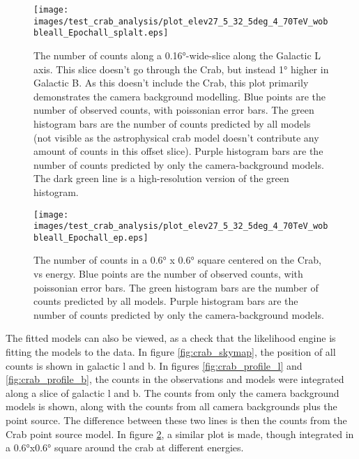     \begin{figure}[h]
      \centering
      \texttt{[image: images/test\_crab\_analysis/plot\_elev27\_5\_32\_5deg\_4\_70TeV\_wobbleall\_Epochall\_splalt.eps]}
      \caption[Crab Profile along Galactic L Off Source]
      {
        The number of counts along a \ang{0.16}-wide-slice along the Galactic L axis.
        This slice doesn't go through the Crab, but instead \ang{1} higher in Galactic B.
        As this doesn't include the Crab, this plot primarily demonstrates the camera background modelling.
        Blue points are the number of observed counts, with poissonian error bars.
        The green histogram bars are the number of counts predicted by all models (not visible as the astrophysical crab model doesn't contribute any amount of counts in this offset slice).
        Purple histogram bars are the number of counts predicted by only the camera-background models.
        The dark green line is a high-resolution version of the green histogram.
      }
      \label{fig:crab_profile_l_off}
    \end{figure}

    \begin{figure}[h]
      \centering
      \texttt{[image: images/test\_crab\_analysis/plot\_elev27\_5\_32\_5deg\_4\_70TeV\_wobbleall\_Epochall\_ep.eps]}
      \caption[Crab Profile in Energy]
      {
        The number of counts in a \ang{0.6} x \ang{0.6} square centered on the Crab, vs energy.
        Blue points are the number of observed counts, with poissonian error bars.
        The green histogram bars are the number of counts predicted by all models.
        Purple histogram bars are the number of counts predicted by only the camera-background models.
      }
      \label{fig:crab_profile_energy}
    \end{figure}
    
    The fitted models can also be viewed, as a check that the likelihood engine is fitting the models to the data.
    In figure \ref{fig:crab_skymap}, the position of all counts is shown in galactic l and b.
    In figures \ref{fig:crab_profile_l} and \ref{fig:crab_profile_b}, the counts in the observations and models were integrated along a slice of galactic l and b.
    The counts from only the camera background models is shown, along with the counts from all camera backgrounds plus the point source.
    The difference between these two lines is then the counts from the Crab point source model.
    In figure \ref{fig:crab_profile_energy}, a similar plot is made, though integrated in a \ang{0.6}x\ang{0.6} square around the crab at different energies.

